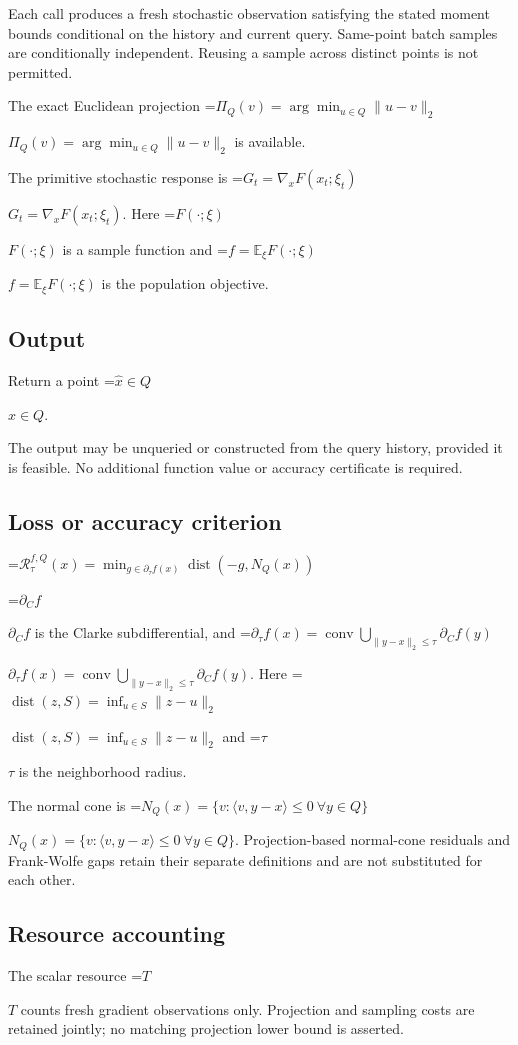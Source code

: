 \documentclass[10pt,a4paper]{article}
\newcommand{\AtlasMath}[1]{\par\begingroup\centering\setbox0=\hbox{$\displaystyle #1$}\ifdim\wd0>1.4\linewidth\typeout{ATLAS WIDE FORMULA: \the\wd0}\fi\ifdim\wd0>\linewidth\resizebox{\linewidth}{!}{\box0}\else\box0\fi\par\endgroup}
\newcommand{\AtlasInlineMath}[1]{\begingroup\setbox0=\hbox{$#1$}\ifdim\wd0>.4\linewidth\endgroup\AtlasMath{#1}\else\endgroup$#1$\fi}
\begin{document}
Each call produces a fresh stochastic observation satisfying the stated moment bounds conditional on the history and current query. Same-point batch samples are conditionally independent. Reusing a sample across distinct points is not permitted.

The exact Euclidean projection \AtlasInlineMath{\Pi_Q(v)=\arg\min_{u\in Q}\|u-v\|_2} is available.

The primitive stochastic response is \AtlasInlineMath{G_t=\nabla_x F(x_t;\xi_t)}. Here \AtlasInlineMath{F(\cdot;\xi)} is a sample function and \AtlasInlineMath{f=\mathbb E_\xi F(\cdot;\xi)} is the population objective.

\subsection{Output}
Return a point \AtlasInlineMath{\widehat x\in Q}.

The output may be unqueried or constructed from the query history, provided it is feasible. No additional function value or accuracy certificate is required.

\subsection{Loss or accuracy criterion}

\AtlasMath{\mathcal{R}_\tau^{f,Q}(x)=\min_{g\in\partial_\tau f(x)}\operatorname{dist}(-g,N_Q(x))}


\AtlasInlineMath{\partial_C f} is the Clarke subdifferential, and \AtlasInlineMath{\partial_\tau f(x)=\operatorname{conv}\bigcup_{\|y-x\|_2\le\tau}\partial_C f(y)}. Here \AtlasInlineMath{\operatorname{dist}(z,S)=\inf_{u\in S}\|z-u\|_2} and \AtlasInlineMath{\tau} is the neighborhood radius.

The normal cone is \AtlasInlineMath{N_Q(x)=\{v:\langle v,y-x\rangle\le0\ \forall y\in Q\}}. Projection-based normal-cone residuals and Frank-Wolfe gaps retain their separate definitions and are not substituted for each other.

\subsection{Resource accounting}
The scalar resource \AtlasInlineMath{T} counts fresh gradient observations only. Projection and sampling costs are retained jointly; no matching projection lower bound is asserted.
\end{document}
